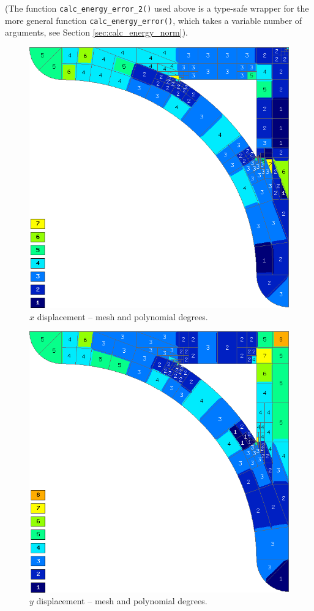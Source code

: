 (The function \verb"calc_energy_error_2()" used above is a type-safe wrapper for the
more general function \verb"calc_energy_error()", which takes a variable number of arguments,
see Section \ref{sec:calc_energy_norm}).

\begin{figure}[p]
  \medskip \centering
  \includegraphics[height=0.43\textheight]{img/sys-xorders.png}
  \caption{$x$ displacement -- mesh and polynomial degrees.}
  \label{fig:sys-xorders}
\end{figure}

\begin{figure}[p]
  \medskip \centering
  \includegraphics[height=0.43\textheight]{img/sys-yorders.png}
  \caption{$y$ displacement -- mesh and polynomial degrees.}
  \label{fig:sys-yorders}
\end{figure}

